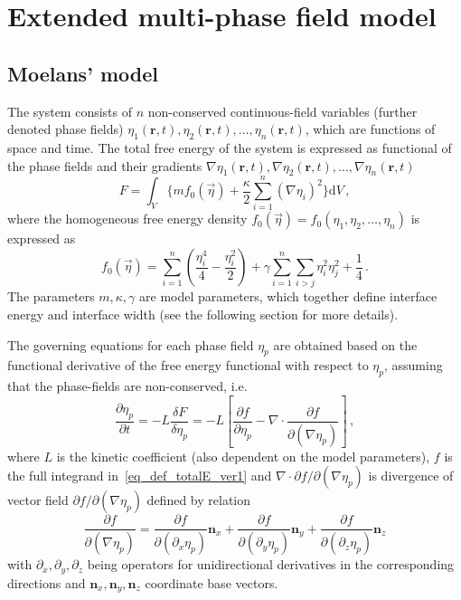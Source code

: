 \chapter{Extended multi-phase field model}

\section{Moelans' model}
The system consists of $n$ non-conserved continuous-field variables (further denoted phase fields) $\eta_1(\mathbf{r},t), \eta_2(\mathbf{r},t),\dots,\eta_n(\mathbf{r},t)$, which are functions of space and time. The total free energy of the system is expressed as functional of the phase fields and their gradients $\nabla\eta_1(\mathbf{r},t), \nabla\eta_2(\mathbf{r},t),\dots,\nabla\eta_n(\mathbf{r},t)$
\begin{equation} \label{eq_def_totalE_ver1}
	F = \int_V \Bigg\{ m f_0(\vec{\eta}) + \frac{\kappa}{2}\sum_{i=1}^n(\nabla \eta_i)^2 \Bigg\} \mathrm{d}V \,,
\end{equation}
where the homogeneous free energy density $f_0(\vec{\eta}) = f_0(\eta_1, \eta_2,\dots,\eta_n)$ is expressed as 
\begin{equation}
	f_0(\vec{\eta}) = \sum_{i=1}^n\left(\frac{\eta_i^4}{4} - \frac{\eta_i^2}{2} \right) +\gamma\sum_{i=1}^n\sum_{i>j}\eta_i^2\eta_j^2 + \frac{1}{4} \,.
\end{equation}
The parameters $m,\kappa, \gamma$ are model parameters, which together define interface energy and interface width (see the following section for more details).

The governing equations for each phase field $\eta_p$ are obtained based on the  functional derivative of the free energy functional with respect to $\eta_p$, assuming that the phase-fields are non-conserved, i.e. %
\begin{equation}
	\label{eq_ACeq_governing}
	\frac{\partial \eta_p}{\partial t} = -L\frac{\delta F}{\delta \eta_p} = -L \left[ \frac{\partial f}{\partial \eta_p} - \nabla\cdot\frac{\partial f}{\partial(\nabla \eta_p)} \right] \,,
\end{equation}
where $L$ is the kinetic coefficient (also dependent on the model parameters), $f$ is the full integrand in~\eqref{eq_def_totalE_ver1} and $\nabla\cdot\partial f/\partial(\nabla \eta_p)$ is divergence of vector field $\partial f/\partial(\nabla \eta_p)$ defined by relation
\begin{equation}
	\frac{\partial f}{\partial(\nabla \eta_p)} = \frac{\partial f}{\partial(\partial_x\eta_p)}\mathbf{n}_x + \frac{\partial f}{\partial(\partial_y \eta_p)}\mathbf{n}_y + \frac{\partial f}{\partial(\partial_z \eta_p)}\mathbf{n}_z
\end{equation}
with $\partial_x,\partial_y,\partial_z$ being operators for unidirectional derivatives in the corresponding directions and $\mathbf{n}_x,\mathbf{n}_y,\mathbf{n}_z$ coordinate base vectors. 

